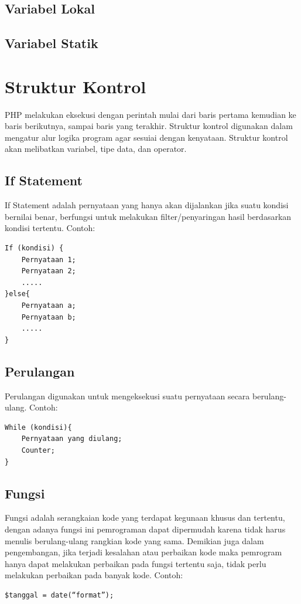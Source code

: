 \subsection{Variabel Lokal}
\subsection{Variabel Statik}
\section{Struktur Kontrol}
PHP melakukan eksekusi dengan perintah mulai dari baris pertama kemudian ke baris berikutnya, sampai baris yang terakhir. Struktur kontrol digunakan dalam mengatur alur logika program agar sesuiai dengan kenyataan. Struktur kontrol akan melibatkan variabel, tipe data, dan operator. 
\subsection{If Statement}
If Statement  adalah pernyataan yang hanya akan dijalankan jika suatu kondisi bernilai benar, berfungsi untuk melakukan filter/penyaringan hasil berdasarkan kondisi tertentu. Contoh:
\begin{lstlisting}
If (kondisi) {
    Pernyataan 1;
    Pernyataan 2;
    .....
}else{
    Pernyataan a;
    Pernyataan b;
    .....
}
\end{lstlisting}
\subsection{Perulangan}
Perulangan digunakan untuk mengeksekusi suatu pernyataan secara berulang-ulang. Contoh:
\begin{lstlisting}
While (kondisi){
    Pernyataan yang diulang;
    Counter;
}
\end{lstlisting}
\subsection{Fungsi}
Fungsi adalah serangkaian kode yang terdapat kegunaan khusus dan tertentu, dengan adanya fungsi ini pemrograman dapat dipermudah karena tidak harus menulis berulang-ulang rangkian kode yang sama. Demikian juga dalam pengembangan, jika terjadi kesalahan atau perbaikan kode maka pemrogram hanya dapat melakukan perbaikan pada fungsi tertentu saja, tidak perlu melakukan perbaikan pada banyak kode. Contoh:
\begin{lstlisting}
$tanggal = date(“format”);
\end{lstlisting}


